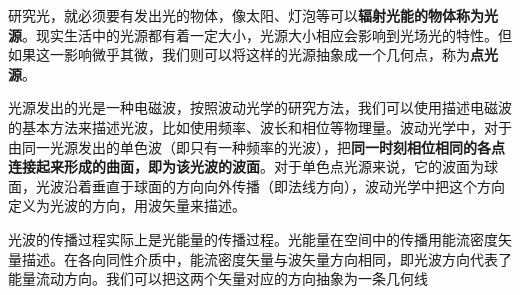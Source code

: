 
研究光，就必须要有发出光的物体，像太阳、灯泡等可以\textbf{辐射光能的物体称为光源}。现实生活中的光源都有着一定大小，光源大小相应会影响到光场光的特性。但如果这一影响微乎其微，我们则可以将这样的光源抽象成一个几何点，称为\textbf{点光源}。

光源发出的光是一种电磁波，按照波动光学的研究方法，我们可以使用描述电磁波的基本方法来描述光波，比如使用频率、波长和相位等物理量。波动光学中，对于由同一光源发出的单色波（即只有一种频率的光波），把\textbf{同一时刻相位相同的各点连接起来形成的曲面，即为该光波的波面}。对于单色点光源来说，它的波面为球面，光波沿着垂直于球面的方向向外传播（即法线方向），波动光学中把这个方向定义为光波的方向，用波矢量来描述。

光波的传播过程实际上是光能量的传播过程。光能量在空间中的传播用能流密度矢量描述。在各向同性介质中，能流密度矢量与波矢量方向相同，即光波方向代表了能量流动方向。我们可以把这两个矢量对应的方向抽象为一条几何线
